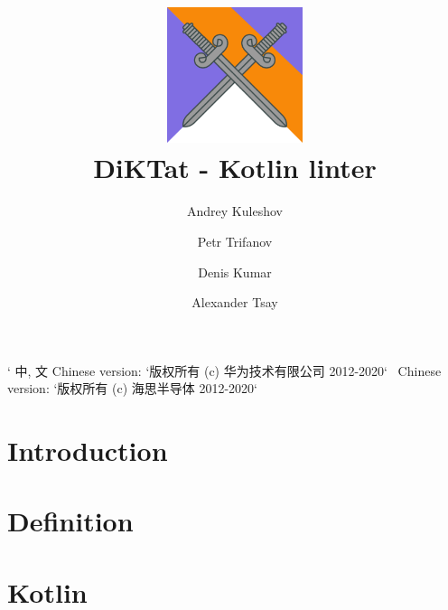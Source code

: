 \documentclass[acmlarge, screen, nonacm]{acmart}
\begin{document}
\begin{CJK*}{UTF8}{gbsn}

\title[]{
  \includegraphics[width = 150pt, height = 150]{pictures/logo.png}\\
  DiKTat - Kotlin linter
}

\author{Andrey Kuleshov}
\author{Petr Trifanov}
\author{Denis Kumar}
\author{Alexander Tsay}

\renewcommand{\shortauthors}{}

\maketitle

\lstMakeShortInline[basicstyle=\ttfamily\bfseries]`
中, 文
Chinese version: `版权所有 (c) 华为技术有限公司 2012-2020` \
Chinese version: `版权所有 (c) 海思半导体 2012-2020` \

\section{Introduction}
\label{sec:intro}


\section{Definition}
\label{sec:definition}


\section{Kotlin}
\label{sec:kotlin}



\end{CJK*}
\end{document}
